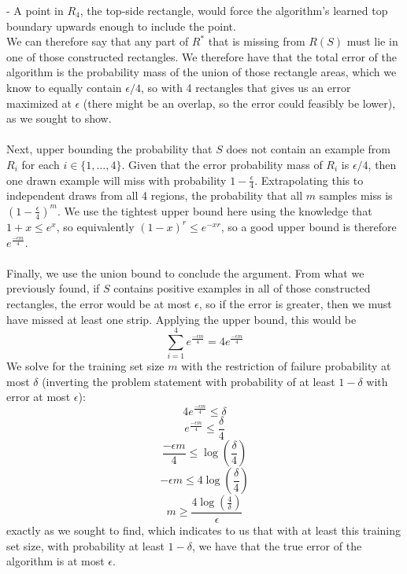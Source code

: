 \documentclass{article}
\begin{document}
{- A point in \(R_4\), the top-side rectangle, would force the algorithm's learned top boundary upwards enough to include the point. \\
We can therefore say that any part of \(R^*\) that is missing from \(R(S)\) must lie in one of those constructed rectangles. 
We therefore have that the total error of the algorithm is the probability mass of the union of those rectangle areas, which we know to equally contain \(\epsilon / 4\), so with 4 rectangles that gives us an error maximized at \(\epsilon\) (there might be an overlap, so the error could feasibly be lower), as we sought to show. \\ \\
Next, upper bounding the probability that \(S\) does not contain an example from \(R_i\) for each \(i \in \{1, \dots, 4\}\). Given that the error probability mass of \(R_i\) is \(\epsilon / 4\), then one drawn example will miss with probability \(1 - \frac{\epsilon}{4}\). Extrapolating this to independent draws from all 4 regions, the probability that all \(m\) samples miss is \((1 - \frac{\epsilon}{4})^m\). We use the tightest upper bound here using the knowledge that \(1 + x \leq e^x\), so equivalently \((1-x)^r \leq e^{-xr}\), so a good upper bound is therefore \(e^{\frac{-\epsilon m}{4}}\). \\ \\
Finally, we use the union bound to conclude the argument. From what we previously found, if \(S\) contains positive examples in all of those constructed rectangles, the error would be at most \(\epsilon\), so if the error is greater, then we must have missed at least one strip. Applying the upper bound, this would be 
\[
  \sum_{i=1}^{4} e^{\frac{-\epsilon m}{4}} = 4e^{\frac{-\epsilon m}{4}}
\]
We solve for the training set size \(m\) with the restriction of failure probability at most \(\delta\) (inverting the problem statement with probability of at least \(1 - \delta\) with error at most \(\epsilon\)):
\[
  4e^{\frac{-\epsilon m}{4}} \leq \delta
\]
\[
  e^{\frac{-\epsilon m}{4}} \leq \frac{\delta}{4}
\]
\[
  \frac{-\epsilon m}{4} \leq \log(\frac{\delta}{4})
\]
\[
  -\epsilon m \leq 4\log(\frac{\delta}{4})
\]
\[
  m \geq \frac{4\log(\frac{4}{\delta})}{\epsilon}
\]
exactly as we sought to find, which indicates to us that with at least this training set size, with probability at least \(1 - \delta\), we have that the true error of the algorithm is at most \(\epsilon\).

}
\end{document}
